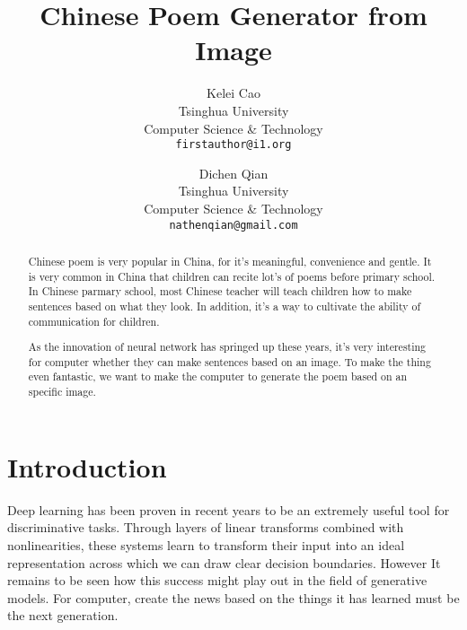 \documentclass[10pt,twocolumn,letterpaper]{article}
\begin{document}
\title{ Chinese Poem Generator from Image}

\author{Kelei Cao\\
Tsinghua University \\
Computer Science \& Technology\\
{\tt\small firstauthor@i1.org}
\and
Dichen Qian\\
Tsinghua University \\
Computer Science \& Technology\\
{\tt\small nathenqian@gmail.com}
}

\maketitle

\begin{abstract}
   	Chinese poem is very popular in China, for it's meaningful, convenience and gentle. It is very common in China that children can recite lot's of poems before primary school. 
	In Chinese parmary school, most Chinese teacher will teach children how to make sentences based on what they look. In addition, it's a way to cultivate the ability of communication for children.

	As the innovation of neural network has springed up these years, it's very interesting for computer whether they can make sentences based on an image. To make the thing even fantastic, we want to make the computer to generate the poem based on an specific image.
	
\end{abstract}

\section{Introduction}
Deep learning has been proven in recent years to be an extremely useful tool for discriminative tasks. Through layers of linear transforms combined with nonlinearities, these systems learn to transform their input into an ideal representation across which we can draw clear decision boundaries. However It remains to be seen how this success might play out in the field of generative models. For computer, create the news based on the things it has learned must be the next generation.
\end{document}
